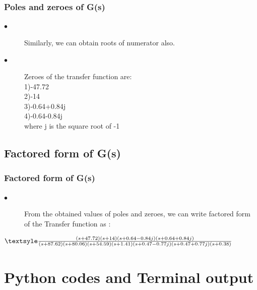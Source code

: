 \documentclass{beamer}
\theoremstyle{remark}
\begin{document}
\begin{frame}
\frametitle{Poles and zeroes of G(s)}
\begin{description}
\item[$\bullet$]Similarly, we can obtain roots of numerator also.
\item[$\bullet$]Zeroes of the transfer function are:\\
1)-47.72\\
2)-14\\
3)-0.64+0.84j\\
4)-0.64-0.84j\\

\vspace{0.1 in}
where j is the square root of -1
\end{description}
\end{frame}









\subsection{Factored form of G(s)}
\begin{frame}
\frametitle{Factored form of G(s)}
\begin{description}
\item[$\bullet$]From the obtained values of poles and zeroes, we can write factored form of the Transfer function as :
\end{description}
\vspace{0.2 in}
\noindent 
 $ {\textsyle \frac{(s+47.72)(s+14)(s+0.64-0.84j)(s+0.64+0.84j)}{(s+87.62)(s+80.06)(s+54.59)(s+1.41)(s+0.47-0.77j)(s+0.47+0.77j)(s+0.38)}} $\\
\noindent
\vspace{0.1 in}

\end{frame}

















\section{Python codes and Terminal output}
\end{document}
